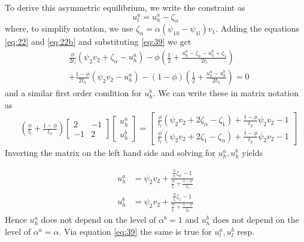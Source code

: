 \documentclass[a4paper,12pt]{article}
\begin{document}
To derive this asymmetric equilibrium, we write the constraint as
\begin{equation}
\label{eq:39}
u_l^a = u_h^a - \zeta_{\alpha}
\end{equation}
where, to simplify notation, we use \(\zeta_{\alpha}=\alpha (\psi_{1h}-\psi_{1l})v_1\).
Adding the equations \eqref{eq:22} and \eqref{eq:22b} and substituting \eqref{eq:39} we get
\begin{equation}
\label{eq:40}
\begin{split}
&\frac{\phi}{2t_l}(\psi_2 v_2 + \zeta_{\alpha} - u_h^a) - \phi(\frac{1}{2} + \frac{u_h^a - \zeta_{\alpha} - u_h^b + \zeta_1}{2t_l} ) \\
&+\frac{1-\phi}{2t_h} (\psi_2 v_2 - u_h^a) - (1-\phi) (\frac{1}{2} + \frac{u_h^a - u_h^b}{2t_h} )   =0
\end{split}
\end{equation}
and a similar first order condition for \(u_h^b\). We can write these in matrix notation as
\begin{equation}
\label{eq:41}
\begin{split}
& (\frac{\phi}{t_l} + \frac{1-\phi}{t_h})
\begin{bmatrix}
2 & -1 \\
-1&  2
\end{bmatrix}
\begin{bmatrix}
u_h^a \\
u_h^b
\end{bmatrix}
=
\begin{bmatrix}
\frac{\phi}{t_l}(\psi_2 v_2 + 2 \zeta_{\alpha} - \zeta_1) + \frac{1-\phi}{t_h}\psi_2 v_2 -1 \\
\frac{\phi}{t_l}(\psi_2 v_2 + 2 \zeta_{1} - \zeta_\alpha) + \frac{1-\phi}{t_h}\psi_2 v_2 -1
\end{bmatrix}
\end{split}
\end{equation}
Inverting the matrix on the left hand side and solving for \(u_h^a,u_h^b\) yields

\begin{align}
\label{eq:47}
u_h^a &= \psi_2 v_2 + \frac{\frac{\phi}{t_l} \zeta_{\alpha} -1}{\frac{\phi}{t_l}+\frac{1-\phi}{t_h}} \\
\label{eq:47b}
u_h^b &= \psi_2 v_2 + \frac{\frac{\phi}{t_l} \zeta_{1} -1}{\frac{\phi}{t_l}+\frac{1-\phi}{t_h}}
\end{align}
Hence \(u_h^a\) does not depend on the level of \(\alpha^b =1\) and \(u_h^b\) does not depend on the level of \(\alpha^a =\alpha\). Via equation \eqref{eq:39} the same is true for \(u_l^a,u_l^b\) resp.
\end{document}
